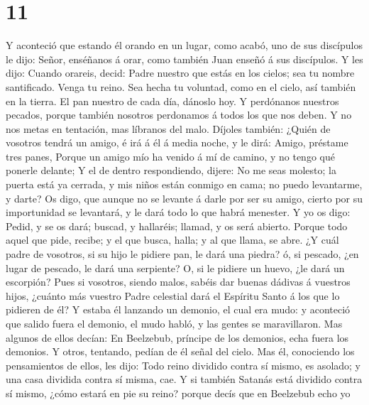 \hypertarget{section-10}{%
\section{11}\label{section-10}}

 Y aconteció que estando él orando en un lugar, como
acabó, uno de sus discípulos le dijo: Señor, enséñanos á orar, como
también Juan enseñó á sus discípulos.  Y les dijo: Cuando
orareis, decid: Padre nuestro que estás en los cielos; sea tu nombre
santificado. Venga tu reino. Sea hecha tu voluntad, como en el cielo,
así también en la tierra.  El pan nuestro de cada día,
dánoslo hoy.  Y perdónanos nuestros pecados, porque
también nosotros perdonamos á todos los que nos deben. Y no nos metas en
tentación, mas líbranos del malo.  Díjoles también: ¿Quién
de vosotros tendrá un amigo, é irá á él á media noche, y le dirá: Amigo,
préstame tres panes,  Porque un amigo mío ha venido á mí
de camino, y no tengo qué ponerle delante;  Y el de dentro
respondiendo, dijere: No me seas molesto; la puerta está ya cerrada, y
mis niños están conmigo en cama; no puedo levantarme, y darte?
 Os digo, que aunque no se levante á darle por ser su
amigo, cierto por su importunidad se levantará, y le dará todo lo que
habrá menester.  Y yo os digo: Pedid, y se os dará;
buscad, y hallaréis; llamad, y os será abierto.  Porque
todo aquel que pide, recibe; y el que busca, halla; y al que llama, se
abre.  ¿Y cuál padre de vosotros, si su hijo le pidiere
pan, le dará una piedra? ó, si pescado, ¿en lugar de pescado, le dará
una serpiente?  O, si le pidiere un huevo, ¿le dará un
escorpión?  Pues si vosotros, siendo malos, sabéis dar
buenas dádivas á vuestros hijos, ¿cuánto más vuestro Padre celestial
dará el Espíritu Santo á los que lo pidieren de él?  Y
estaba él lanzando un demonio, el cual era mudo: y aconteció que salido
fuera el demonio, el mudo habló, y las gentes se maravillaron.
 Mas algunos de ellos decían: En Beelzebub, príncipe de
los demonios, echa fuera los demonios.  Y otros,
tentando, pedían de él señal del cielo.  Mas él,
conociendo los pensamientos de ellos, les dijo: Todo reino dividido
contra sí mismo, es asolado; y una casa dividida contra sí misma, cae.
 Y si también Satanás está dividido contra sí mismo,
¿cómo estará en pie su reino? porque decís que en Beelzebub echo yo
